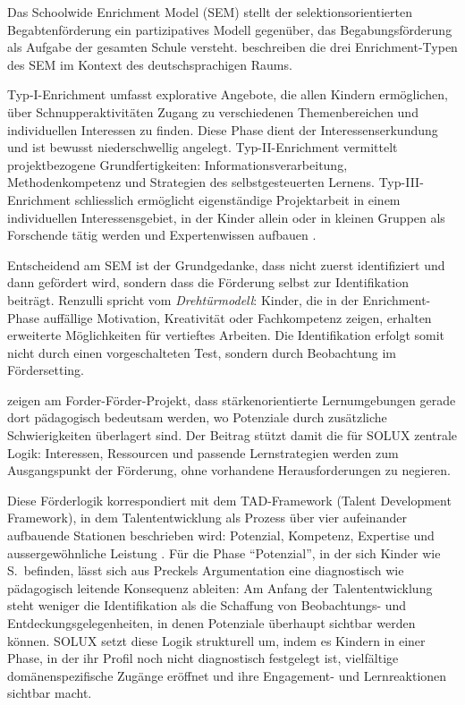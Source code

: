 \documentclass[ngerman, a4paper]{article}
\begin{document}
Das Schoolwide Enrichment Model (SEM) stellt der selektionsorientierten
Begabtenförderung ein partizipatives Modell gegenüber, das Begabungsförderung
als Aufgabe der gesamten Schule versteht. \textcite[S.\,333--347]{reisrenzullimueller2021sem}
beschreiben die drei Enrichment-Typen des SEM im Kontext des deutschsprachigen Raums.

Typ-I-Enrichment umfasst explorative Angebote, die allen Kindern ermöglichen, über
Schnupperaktivitäten Zugang zu verschiedenen Themenbereichen und individuellen
Interessen zu finden. Diese Phase dient der Interessenserkundung und ist bewusst
niederschwellig angelegt. Typ-II-Enrichment vermittelt projektbezogene Grundfertigkeiten:
Informationsverarbeitung, Methodenkompetenz und Strategien des selbstgesteuerten Lernens.
Typ-III-Enrichment schliesslich ermöglicht eigenständige Projektarbeit in einem
individuellen Interessensgebiet, in der Kinder allein oder in kleinen Gruppen als
Forschende tätig werden und Expertenwissen aufbauen
\parencite[S.\,94--99]{hoyer2013begabung}.

Entscheidend am SEM ist der Grundgedanke, dass nicht zuerst identifiziert und dann
gefördert wird, sondern dass die Förderung selbst zur Identifikation beiträgt.
Renzulli spricht vom \textit{Drehtürmodell}: Kinder, die in der Enrichment-Phase
auffällige Motivation, Kreativität oder Fachkompetenz zeigen, erhalten erweiterte
Möglichkeiten für vertieftes Arbeiten. Die Identifikation erfolgt somit nicht durch
einen vorgeschalteten Test, sondern durch Beobachtung im Fördersetting.

\textcite[S.\,264--267]{schulteterhardt2020potenzialentwicklung} zeigen am
Forder-Förder-Projekt, dass stärkenorientierte Lernumgebungen gerade dort
pädagogisch bedeutsam werden, wo Potenziale durch zusätzliche Schwierigkeiten
überlagert sind. Der Beitrag stützt damit die für SOLUX zentrale Logik:
Interessen, Ressourcen und passende Lernstrategien werden zum Ausgangspunkt
der Förderung, ohne vorhandene Herausforderungen zu negieren.

Diese Förderlogik korrespondiert mit dem TAD-Framework (Talent Development
Framework), in dem Talententwicklung als Prozess über vier aufeinander
aufbauende Stationen beschrieben wird: Potenzial, Kompetenz, Expertise und
aussergewöhnliche Leistung \parencite[S.\,274--289]{preckel2021tad}. Für die
Phase \enquote{Potenzial}, in der sich Kinder wie S.\ befinden, lässt sich aus
Preckels Argumentation eine diagnostisch wie pädagogisch leitende Konsequenz
ableiten: Am Anfang der Talententwicklung steht weniger die Identifikation
als die Schaffung von Beobachtungs- und Entdeckungsgelegenheiten, in denen
Potenziale überhaupt sichtbar werden können. SOLUX setzt diese Logik
strukturell um, indem es Kindern in einer Phase, in der ihr Profil noch nicht
diagnostisch festgelegt ist, vielfältige domänenspezifische Zugänge
eröffnet und ihre Engagement- und Lernreaktionen sichtbar macht.
\end{document}
